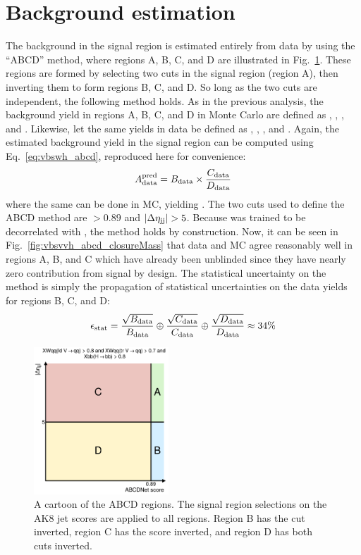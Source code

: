 \section{Background estimation}
The background in the signal region is estimated entirely from data by using the ``ABCD'' method, where regions A, B, C, and D are illustrated in Fig.~\ref{fig:vbsvvh_abcd}. %
These regions are formed by selecting two cuts in the signal region (region A), then inverting them to form regions B, C, and D. 
So long as the two cuts are independent, the following method holds. 
As in the previous analysis, the background yield in regions A, B, C, and D in Monte Carlo are defined as \AMC, \BMC, \CMC, and \DMC.
Likewise, let the same yields in data be defined as  \Adata, \Bdata, \Cdata, and \Ddata.
Again, the estimated background yield in the signal region \AdataPred can be computed using Eq.~\ref{eq:vbswh_abcd}, reproduced here for convenience:
\begin{equation*}
    A_{\text{data}}^{\text{pred}} = B_{\text{data}}\times\frac{C_{\text{data}}}{D_{\text{data}}}
\end{equation*}
where the same can be done in MC, yielding \AMCPred. 
The two cuts used to define the ABCD method are \ABCDNet $> 0.89$ and $|\Delta\eta_{\mathrm{j}\mathrm{j}}| > 5$. 
Because \ABCDNet was trained to be decorrelated with \detajj, the method holds by construction. 
Now, it can be seen in Fig.~\ref{fig:vbsvvh_abcd_closureMass} that data and MC agree reasonably well in regions A, B, and C which have already been unblinded since they have nearly zero contribution from signal by design. 
The statistical uncertainty \Estat on the method is simply the propagation of statistical uncertainties on the data yields for regions B, C, and D:
\begin{equation}\label{eq:vbsvvh_statUnc}
    \Estat = \frac{\sqrt{\Bdata}}{\Bdata} \oplus \frac{\sqrt{\Cdata}}{\Cdata} \oplus \frac{\sqrt{\Ddata}}{\Ddata} \approx 34\% %
\end{equation}

\begin{figure}[htb]
    \centering
    \includegraphics[width=0.45\textwidth]{fig/vbsvvh/ABCD_abcdnet_score_gt_0p89_vs_abs_deta_jj_gt_5p0.pdf}
    \caption[A cartoon of the ABCD regions]{
        A cartoon of the ABCD regions. 
        The signal region selections on the AK8 jet \ParticleNet scores are applied to all regions. 
        Region B has the \detajj cut inverted, region C has the \ABCDNet score inverted, and region D has both cuts inverted. 
    }
    \label{fig:vbsvvh_abcd}
\end{figure}

